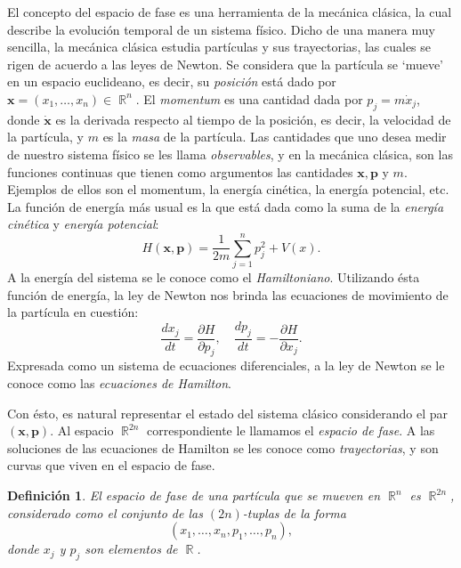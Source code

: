 \documentclass[a4paper]{report}
\DeclareMathOperator{\R}{\mathbb{R}}
\newtheorem{definition}{Definición}
\begin{document}
  El concepto del espacio de fase es una herramienta de la
  mecánica clásica, la cual describe la evolución temporal
  de un sistema físico. Dicho de una manera muy sencilla, la
  mecánica clásica estudia partículas y sus trayectorias,
  las cuales se rigen de acuerdo a las leyes de Newton.  Se
  considera que la partícula se `mueve' en un espacio
  euclideano, es decir, su \textit{posición} está dado por
  $\bm{x} = (x_1,\ldots,x_n) \in \R^{n}$. El
  \textit{momentum} es una cantidad dada por $p_j = m \dot
  x_j$, donde $\bm{\dot x}$ es la derivada respecto al
  tiempo de la posición, es decir, la velocidad de la
  partícula, y $m$ es la \textit{masa} de la partícula. Las
  cantidades que uno desea medir de nuestro sistema físico
  se les llama \textit{observables}, y en la mecánica
  clásica, son las funciones continuas que tienen como
  argumentos las cantidades $\bm{x},\bm{p}$ y $m$. Ejemplos
  de ellos son el momentum, la energía cinética, la energía
  potencial, etc. La función de energía más usual es la que
  está dada como la suma de la \textit{energía cinética} y
  \textit{energía potencial}:
  \begin{equation}
    H(\bm{x},\bm{p})
    = \frac{1}{2m} \sum_{j=1}^{n} p_j^2 + V(x).
  \end{equation}
  A la energía del sistema se le conoce como el
  \textit{Hamiltoniano}.  Utilizando ésta función de
  energía, la ley de Newton nos brinda las ecuaciones de
  movimiento de la partícula en cuestión:
  \begin{equation}
    \frac{dx_j}{dt}
    = \frac{\partial H}{\partial p_j},
    \quad
    \frac{dp_j}{dt}
    = -\frac{\partial H}{\partial x_j}.
  \end{equation}
  Expresada como un sistema de ecuaciones diferenciales, a
  la ley de Newton se le conoce como las \textit{ecuaciones
  de Hamilton}.  

  Con ésto, es natural representar el estado del sistema
  clásico considerando el par $(\bm{x},\bm{p})$. Al espacio
  $\R^{2n}$ correspondiente le llamamos el \textit{espacio
  de fase}. A las soluciones de las ecuaciones de Hamilton
  se les conoce como \textit{trayectorias}, y son curvas que
  viven en el espacio de fase.
  \begin{definition}
    El espacio de fase de una partícula que se mueven en
    $\R^{n}$ es $\R^{2n}$, considerado como el conjunto de
    las $(2n)$-tuplas de la forma
    \[
      \left(
        x_1, \ldots, x_n, p_1, \ldots, p_n
      \right),
    \] 
    donde $x_j$ y $p_j$ son elementos de $\R$.
  \end{definition}
\end{document}
